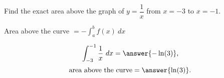 \documentclass{ximera}
\begin{document}
\begin{problem}
Find the exact area above the graph of $y = \dfrac{1}{x}$ from $x = -3$ to $x = -1$. \\
\begin{hint}
Area above the curve $= -\int_a^b f(x) \ dx$
\end{hint}
\[\int_{-3}^{-1} \frac{1}{x} \ dx = \answer{-\ln(3)},\]
\[\text{area above the curve} = \answer{\ln(3)}.\]
\end{problem}



\begin{center}
\begin{foldable}
\end{foldable}
\end{center}
\end{document}
